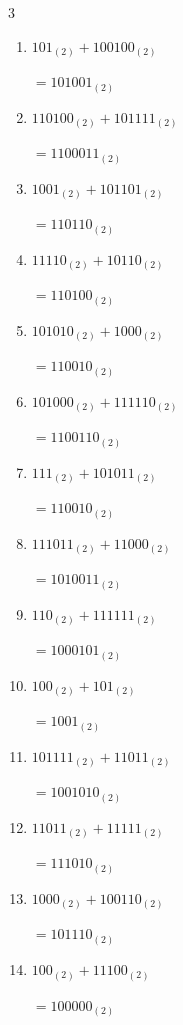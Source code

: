 \begin{multicols}{3}
\begin{enumerate}
  \item $101_{(2)} + 100100_{(2)}$

        $=101001_{(2)}$

  \item $110100_{(2)} + 101111_{(2)}$

        $=1100011_{(2)}$

  \item $1001_{(2)} + 101101_{(2)}$

        $=110110_{(2)}$

  \item $11110_{(2)} + 10110_{(2)}$

        $=110100_{(2)}$

  \item $101010_{(2)} + 1000_{(2)}$

        $=110010_{(2)}$

  \item $101000_{(2)} + 111110_{(2)}$

        $=1100110_{(2)}$

  \item $111_{(2)} + 101011_{(2)}$

        $=110010_{(2)}$

\columnbreak %

  \item $111011_{(2)} + 11000_{(2)}$

        $=1010011_{(2)}$

  \item $110_{(2)} + 111111_{(2)}$

        $=1000101_{(2)}$

  \item $100_{(2)} + 101_{(2)}$

        $=1001_{(2)}$

  \item $101111_{(2)} + 11011_{(2)}$

        $=1001010_{(2)}$

  \item $11011_{(2)} + 11111_{(2)}$

        $=111010_{(2)}$

  \item $1000_{(2)} + 100110_{(2)}$

        $=101110_{(2)}$

  \item $100_{(2)} + 11100_{(2)}$

        $=100000_{(2)}$


\end{enumerate}
\end{multicols}
